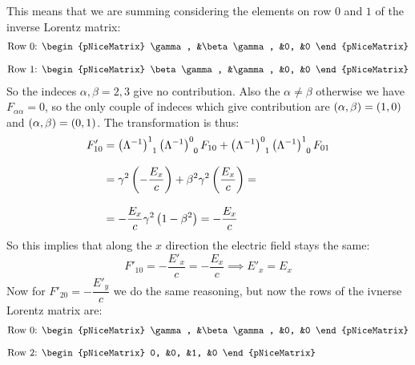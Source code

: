 This means that we are summing considering the elements on row $0$ and $1$ of the inverse Lorentz matrix:
\begin{equation}
  \begin{split}
    &\text{Row 0: } \begin{pNiceMatrix}
      \gamma, &\beta\gamma, &0, &0
    \end{pNiceMatrix} \\[8pt]
    &\text{Row 1: } \begin{pNiceMatrix}
      \beta\gamma, &\gamma, &0, &0
    \end{pNiceMatrix}
  \end{split}
\end{equation}
So the indeces $\alpha,\beta=2,3$ give no contribution. Also the $\alpha \neq \beta$ otherwise we have $F_{\alpha\alpha} = 0$, so the only couple of indeces which give contribution are $\left(\alpha, \beta\right) = \left(1, 0\right)$ and $\left(\alpha, \beta\right) = \left(0, 1\right)$. The transformation is thus:
\begin{equation}
  \begin{split}
    F'_{10} &= \tensor{\brackets{\lm^{-1}}}{^{1}_{1}}\tensor{\brackets{\lm^{-1}}}{^{0}_{0}}F_{10} + \tensor{\brackets{\lm^{-1}}}{^{0}_{1}}\tensor{\brackets{\lm^{-1}}}{^{1}_{0}}F_{01} \\[8pt]
    &= \gamma^2\brackets{-\dfrac{E_x}{c}} + \beta^2\gamma^2\brackets{\dfrac{E_x}{c}} = \\[8pt]
    &= -\dfrac{E_x}{c}\gamma^2\brackets{1-\beta^2} = -\dfrac{E_x}{c}
  \end{split}
\end{equation}
So this implies that along the $x$ direction the electric field stays the same:
\begin{equation}
  F'_{10} = -\dfrac{E'_x}{c} = -\dfrac{E_x}{c} \implies E'_x = E_x
\end{equation}
Now for $F'_{20} = -\dfrac{E'_y}{c}$ we do the same reasoning, but now the rows of the ivnerse Lorentz matrix are:
\begin{equation}
  \begin{split}
    &\text{Row 0: } \begin{pNiceMatrix}
      \gamma, &\beta\gamma, &0, &0
    \end{pNiceMatrix}\\[8pt]
    &\text{Row 2: } \begin{pNiceMatrix}
      0, &0, &1, &0
    \end{pNiceMatrix}
  \end{split}
\end{equation}
